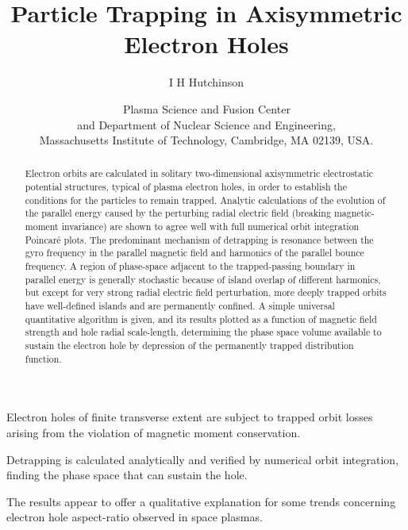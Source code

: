 \documentclass{agujournal2019}
\date{}
\def\maketitle{}
\def\dateskip{}
\def\authors#1{\author{#1}}
\def\affiliation#1#2{\date{$^{#1}$#2}}
\def\dateskip{\medskip}
\begin{document}
\title{Particle Trapping in Axisymmetric Electron Holes}
\authors{I H Hutchinson}
\affiliation{}{Plasma Science and Fusion Center\\ and
Department of Nuclear Science and Engineering,\\ \dateskip
Massachusetts Institute of Technology, Cambridge, MA 02139, USA.}

\maketitle

\ifagu
\begin{keypoints}
\item Electron holes of finite transverse extent are subject to trapped orbit
losses arising from the violation of magnetic moment conservation.
\item  Detrapping is calculated analytically and verified by numerical
orbit integration, finding the phase space that can sustain the hole.
\item The results appear to offer a qualitative explanation for some
trends concerning electron hole aspect-ratio observed in space
plasmas.
\end{keypoints}
\fi

\begin{abstract}
  Electron orbits are calculated in solitary two-dimensional
  axisymmetric electrostatic potential structures, typical of plasma
  electron holes, in order to establish the conditions for the
  particles to remain trapped.  Analytic calculations of the evolution
  of the parallel energy caused by the perturbing radial electric
  field (breaking magnetic-moment invariance) 
  are shown to agree well with full numerical orbit integration
  Poincar\'e plots. The predominant mechanism of detrapping is
  resonance between the gyro frequency in the parallel magnetic field
  and harmonics of the parallel bounce frequency. A region of
  phase-space adjacent to the trapped-passing boundary in parallel
  energy is generally stochastic because of island overlap of
  different harmonics, but except for very strong radial electric
  field perturbation, more deeply trapped orbits have well-defined
  islands and are permanently confined. A simple universal
  quantitative algorithm is given, and its results plotted as a
  function of magnetic field strength and hole radial scale-length,
  determining the phase space volume available to sustain the electron
  hole by depression of the permanently trapped distribution function.
\end{abstract}
\end{document}
